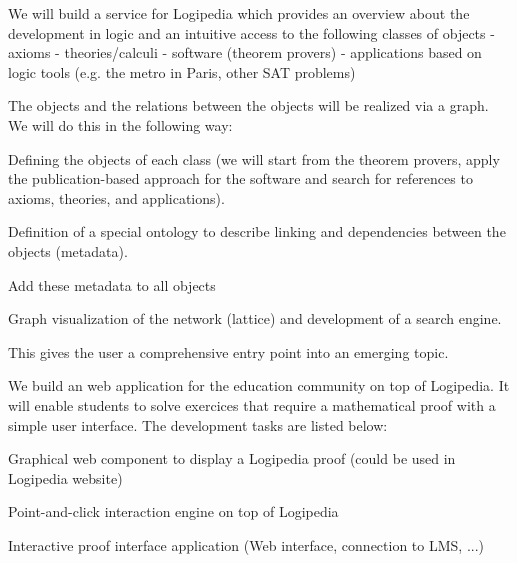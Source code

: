 \begin{workpackage}[id=dissemination,type=MGT,wphases=1-48,
  short={Dissemination},
  title={Dissemination, communication and exploitation},
  lead=Lie,LieRM=2,InrRM=6,BirRM=4,CleRM=2,ImtRM=2,StrRM=2,ZibRM=14,EduRM=12]
\begin{tasklist}
  \begin{task}[id=zib,
      title=Linking scientific publications to Logipedia,
      lead=Zib,ZibRM=12,wphases=12-23]
    We will build a service for Logipedia which provides an overview
    about the development in logic and an intuitive access to the
    following classes of objects - axioms - theories/calculi -
    software (theorem provers) - applications based on logic tools
    (e.g. the metro in Paris, other SAT problems)

    The objects and the relations between the objects will be
    realized via a graph. We will do this in the following way:
    \begin{compactitem}
    \item Defining the objects of each class (we will start from the
      theorem provers, apply the publication-based approach for the
      software and search for references to axioms, theories, and
      applications).
    \item Definition of a special ontology to describe linking and
      dependencies between the objects (metadata).
    \item Add these metadata to all objects
    \item Graph visualization of the network (lattice) and development
      of a search engine.
    \end{compactitem}
    This gives the user a comprehensive entry point into an emerging
    topic.
  \end{task}

  \begin{task}[id=edukera,
      title=Web teaching interface for doing proofs at school,
      lead=Edu,EduRM=12,wphases=12-23]
    We build an web application for the education community on top of Logipedia. It will enable students to solve exercices that require
    a mathematical proof with a simple user interface.
    The development tasks are listed below:
    \begin{compactitem}
    \item Graphical web component to display a Logipedia proof (could be used in Logipedia website)
    \item Point-and-click interaction engine on top of Logipedia
    \item Interactive proof interface application (Web interface, connection to LMS, ...)
    \end{compactitem}
  \end{task}


\end{tasklist}
\end{workpackage}
